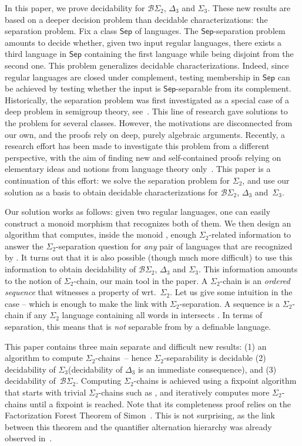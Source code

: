 \documentclass[envcountsame]{llncs}
\newcommand{\sic}[1]{\ensuremath{\Sigma_{#1}}\xspace}
\newcommand{\sicd}{\ensuremath{\Sigma_{2}}\xspace}
\newcommand{\bscd}{\ensuremath{\mathcal{B}\Sigma_{2}}\xspace}
\newcommand{\dect}{\ensuremath{\Delta_{3}}\xspace}
\newcommand{\sict}{\ensuremath{\Sigma_{3}}\xspace}
\newcommand\Sep{\ensuremath{\mathsf{Sep}}\xspace}
\newcommand\qchain[1]{\ensuremath{\sic{#1}}-chain\xspace}
\newcommand\qchains[1]{\ensuremath{\sic{#1}}-chains\xspace}
\newcommand\dchain{\qchain{2}}
\newcommand\dchains{\qchains{2}}
\begin{document}
In this paper, we prove decidability for \bscd, \dect and \sict. These new
results are based on a deeper decision problem than decidable
characterizations: the separation problem. Fix a class \Sep of languages. The
\Sep-separation problem amounts to decide whether, given two input regular
languages, there exists a third language in \Sep containing the first language
while being disjoint from the second one. This problem generalizes
decidable characterizations. Indeed, since regular languages are closed under
complement, testing membership in \Sep can be achieved by testing whether the
input is \Sep-separable from its complement. Historically, the separation problem
was first investigated as a special case of a deep problem in semigroup
theory, see~\cite{MR1709911}. This line of research gave solutions to the
problem for several classes. However, the motivations are disconnected from our own, and the proofs rely on
deep, purely algebraic arguments. Recently, a research effort has been made to
investigate this problem from a different perspective, with the aim of finding
new and self-contained proofs relying on elementary ideas and notions from
language theory only~\cite{martens,pvzmfcs13,pzfo,pvzltt}. This paper is a
continuation of this effort: we solve the separation problem for \sicd, and
use our solution as a basis to obtain decidable characterizations for \bscd,
\dect and~\sict.

Our solution works as follows: given two regular languages, one can
easily construct a monoid morphism  that
recognizes both of them. We then design an algorithm that computes, inside the
monoid ,
enough \sicd-related information to answer the \sicd-separation
question for \emph{any} pair of languages that are recognized by
. It turns out that it is also possible (though much more
difficult) to use this information to obtain decidability of \bscd,
\dect and \sict. This information amounts to the notion of \dchain,
our main tool in the paper. A \dchain is an \emph{ordered
  sequence}  that witnesses a property of
 wrt.\ \sicd. Let us give some intuition in the case  -- which is enough to make the
link with \sicd-separation. A sequence  is a \dchain if
any \sicd language containing all words in  
intersects . In terms of separation, this means that
 is \emph{not} separable from  by a
 definable language.

This paper contains three main separate and difficult new results:
(1) an algorithm to compute \dchains\ -- hence \sicd-separability is decidable (2)
decidability of \sict (decidability of \dect is an immediate
consequence), and (3) decidability of~\bscd. Computing \dchains is
achieved using a fixpoint algorithm that starts with trivial \dchains
such as , and iteratively computes more \dchains until a
fixpoint is reached. Note that its completeness proof relies on
the Factorization Forest Theorem of Simon~\cite{simonfacto}. This is
not surprising, as the link between this theorem and the quantifier
alternation hierarchy was already observed in~\cite{pwdelta,bfacto}.
\end{document}
